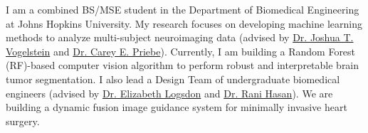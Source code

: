 \documentclass[11pt, letterpaper, sans, citecolor=blue, colorlinks=true, urlcolor=blue]{moderncv}
\begin{document}
\makecvtitle
\vspace*{-1.5\baselineskip}
I am a combined BS/MSE student in the Department of Biomedical Engineering at Johns Hopkins University. My research focuses on developing machine learning methods to analyze multi-subject neuroimaging data (advised by \href{https://jovo.me}{Dr. Joshua T. Vogelstein} and \href{https://www.ams.jhu.edu/~priebe/}{Dr. Carey E. Priebe}). Currently, I am building a Random Forest (RF)-based computer vision algorithm to perform robust and interpretable brain tumor segmentation. I also lead a Design Team of undergraduate biomedical engineers (advised by \href{https://www.bme.jhu.edu/faculty_staff/elizabeth-logsdon-phd/}{Dr. Elizabeth Logsdon} and \href{https://www.hopkinsmedicine.org/profiles/results/directory/profile/1571333/rani-hasan}{Dr. Rani Hasan}). We are building a dynamic fusion image guidance system for minimally invasive heart surgery.


% 




% 

\end{document}
